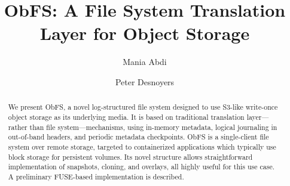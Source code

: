 \documentclass[sigconf,anonymous,10pt]{acmart}
\begin{document}
\title{ObFS: A File System Translation Layer for Object Storage}

\author{Mania Abdi}

\author{Peter Desnoyers}


\begin{abstract}
We present ObFS, a novel log-structured file system designed to use S3-like write-once object storage as its underlying media.
It is based on traditional translation layer---rather than file system---mechanisms, using in-memory metadata, logical journaling in out-of-band headers, and periodic metadata checkpoints.
ObFS is a single-client file system over remote storage, targeted to containerized applications which typically use block storage for persistent volumes.
Its novel structure allows straightforward implementation of snapshots, cloning, and overlays, all highly useful for this use case.
A preliminary FUSE-based implementation is described.
\end{abstract}

\end{document}
